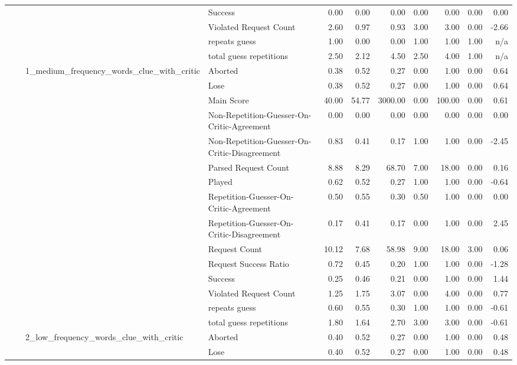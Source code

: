 \begin{tabular}{llllrrrrrrr}
 &  &  & Success & 0.00 & 0.00 & 0.00 & 0.00 & 0.00 & 0.00 & 0.00 \\
 &  &  & Violated Request Count & 2.60 & 0.97 & 0.93 & 3.00 & 3.00 & 0.00 & -2.66 \\
 &  &  & repeats guess & 1.00 & 0.00 & 0.00 & 1.00 & 1.00 & 1.00 & n/a \\
 &  &  & total guess repetitions & 2.50 & 2.12 & 4.50 & 2.50 & 4.00 & 1.00 & n/a \\
\cline{3-11}
 &  & \multirow[t]{15}{*}{1_medium_frequency_words_clue_with_critic} & Aborted & 0.38 & 0.52 & 0.27 & 0.00 & 1.00 & 0.00 & 0.64 \\
 &  &  & Lose & 0.38 & 0.52 & 0.27 & 0.00 & 1.00 & 0.00 & 0.64 \\
 &  &  & Main Score & 40.00 & 54.77 & 3000.00 & 0.00 & 100.00 & 0.00 & 0.61 \\
 &  &  & Non-Repetition-Guesser-On-Critic-Agreement & 0.00 & 0.00 & 0.00 & 0.00 & 0.00 & 0.00 & 0.00 \\
 &  &  & Non-Repetition-Guesser-On-Critic-Disagreement & 0.83 & 0.41 & 0.17 & 1.00 & 1.00 & 0.00 & -2.45 \\
 &  &  & Parsed Request Count & 8.88 & 8.29 & 68.70 & 7.00 & 18.00 & 0.00 & 0.16 \\
 &  &  & Played & 0.62 & 0.52 & 0.27 & 1.00 & 1.00 & 0.00 & -0.64 \\
 &  &  & Repetition-Guesser-On-Critic-Agreement & 0.50 & 0.55 & 0.30 & 0.50 & 1.00 & 0.00 & 0.00 \\
 &  &  & Repetition-Guesser-On-Critic-Disagreement & 0.17 & 0.41 & 0.17 & 0.00 & 1.00 & 0.00 & 2.45 \\
 &  &  & Request Count & 10.12 & 7.68 & 58.98 & 9.00 & 18.00 & 3.00 & 0.06 \\
 &  &  & Request Success Ratio & 0.72 & 0.45 & 0.20 & 1.00 & 1.00 & 0.00 & -1.28 \\
 &  &  & Success & 0.25 & 0.46 & 0.21 & 0.00 & 1.00 & 0.00 & 1.44 \\
 &  &  & Violated Request Count & 1.25 & 1.75 & 3.07 & 0.00 & 4.00 & 0.00 & 0.77 \\
 &  &  & repeats guess & 0.60 & 0.55 & 0.30 & 1.00 & 1.00 & 0.00 & -0.61 \\
 &  &  & total guess repetitions & 1.80 & 1.64 & 2.70 & 3.00 & 3.00 & 0.00 & -0.61 \\
\cline{3-11}
 &  & \multirow[t]{15}{*}{2_low_frequency_words_clue_with_critic} & Aborted & 0.40 & 0.52 & 0.27 & 0.00 & 1.00 & 0.00 & 0.48 \\
 &  &  & Lose & 0.40 & 0.52 & 0.27 & 0.00 & 1.00 & 0.00 & 0.48 \\

\end{tabular}
